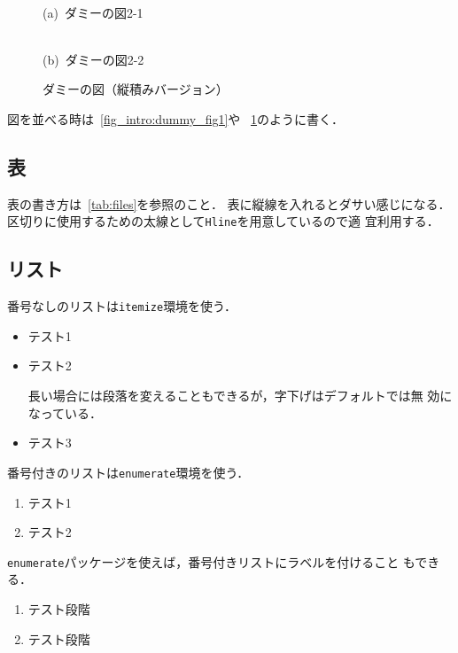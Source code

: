\begin{figure}[bt]
 \centering
 \fbox{\rule{0.8\hsize}{0pt}\rule{0pt}{2cm}}\\
 (a)~ダミーの図2-1
 \vspace{\figuresep}

 \fbox{\rule{0.8\hsize}{0pt}\rule{0pt}{2cm}}\\
 (b)~ダミーの図2-2
 \caption{ダミーの図（縦積みバージョン）}
 \label{fig_intro:dummy_fig2}
\end{figure}

図を並べる時は\figurename~\ref{fig_intro:dummy_fig1}や
\figurename~\ref{fig_intro:dummy_fig2}のように書く．

\subsection{表}

表の書き方は\tablename~\ref{tab:files}を参照のこと．
表に縦線を入れるとダサい感じになる．
区切りに使用するための太線として\texttt{\yen Hline}を用意しているので適
宜利用する．

\subsection{リスト}

番号なしのリストは\texttt{itemize}環境を使う．
\begin{itemize}
 \item テスト1
 \item テスト2

       長い場合には段落を変えることもできるが，字下げはデフォルトでは無
       効になっている．
 \item テスト3
\end{itemize}

番号付きのリストは\texttt{enumerate}環境を使う．
\begin{enumerate}
 \item テスト1
 \item テスト2
\end{enumerate}

\texttt{enumerate}パッケージを使えば，番号付きリストにラベルを付けること
もできる．
\begin{enumerate}[（第1段階）]
 \item テスト段階
 \item テスト段階
\end{enumerate}

